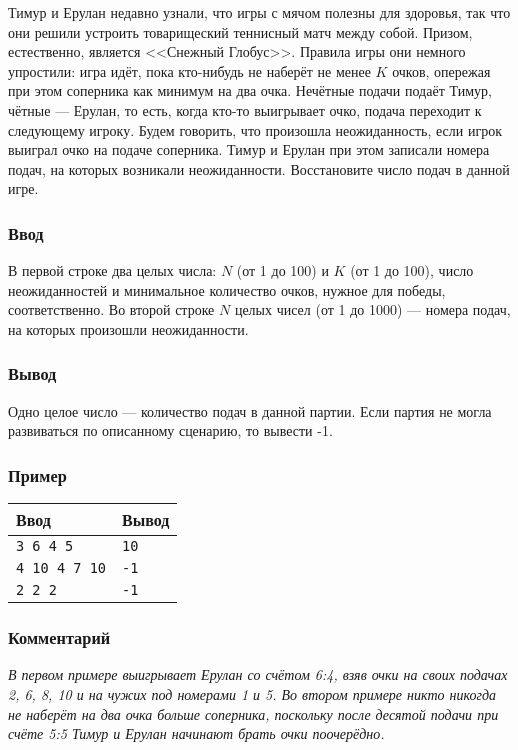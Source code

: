 \documentclass[10pt, a4paper]{article}
\newcommand{\informat}[1]
{
	\subsubsection*{Ввод} #1
}
\newcommand{\outformat}[1]
{
	\subsubsection*{Вывод} #1
}
\newcommand{\exampleee}[6]
{
	\subsubsection*{Пример}
	\noindent
	\begin{center}
	\begin{tabularx}{\linewidth}{|X|X|}
	\hline
	Ввод 	& Вывод  	\\
	\hline
	{\tt #1} & {\tt #2}	\\
	\hline
	{\tt #3} & {\tt #4}	\\
	\hline
	{\tt #5} & {\tt #6}	\\
	\hline
	\end{tabularx}
	\end{center}
}
\newcommand{\excomm}[1]
{
	\subsubsection*{Комментарий}
	\textit{#1}
}
\begin{document}
Тимур и Ерулан недавно узнали, что игры с мячом полезны для здоровья, так что они решили устроить товарищеский теннисный матч между собой. Призом, естественно, является <<Снежный Глобус>>. Правила игры они немного упростили: игра идёт, пока кто-нибудь не наберёт не менее $K$ очков, опережая при этом соперника как минимум на два очка. Нечётные подачи подаёт Тимур, чётные --- Ерулан, то есть, когда кто-то выигрывает очко, подача переходит к следующему игроку. Будем говорить, что произошла неожиданность, если игрок выиграл очко на подаче соперника. Тимур и Ерулан при этом записали номера подач, на которых возникали неожиданности. Восстановите число подач в данной игре.
 
\informat{В первой строке два целых числа: $N$ (от 1 до 100) и $K$ (от 1 до 100), число неожиданностей и минимальное количество очков, нужное для победы, соответственно. \newline
Во второй строке $N$ целых чисел (от 1 до 1000) --- номера подач, на которых произошли неожиданности.}

\outformat{Одно целое число --- количество подач в данной партии. Если партия не могла развиваться по описанному сценарию, то вывести -1.}

\exampleee{3 6 \newline 1 4 5}{10}{4 10 \newline 1 4 7 10}{-1}{2 2 \newline 1 2}{-1}

\excomm{В первом примере выигрывает Ерулан со счётом 6:4, взяв очки на своих подачах 2, 6, 8, 10 и на чужих под номерами 1 и 5. \newline
Во втором примере никто никогда не наберёт на два очка больше соперника, поскольку после десятой подачи при счёте 5:5 Тимур и Ерулан начинают брать очки поочерёдно.}
\end{document}
